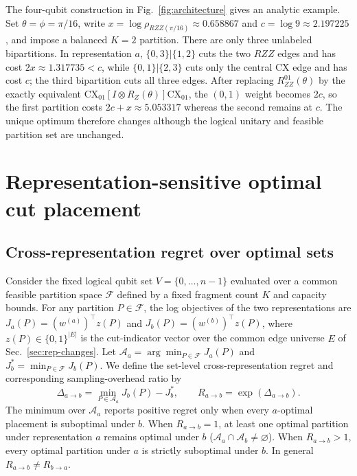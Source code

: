\documentclass[
  aps,
  pra,
  reprint,
  amsmath,
  amssymb,
  longbibliography,
  nofootinbib,
  floatfix
]{revtex4-2}
\theoremstyle{plain}
\begin{document}
The four-qubit construction in Fig.~\ref{fig:architecture} gives an analytic example. Set $\theta=\phi=\pi/16$, write $x=\log\rho_{RZZ(\pi/16)}\approx0.658867$ and $c=\log9\approx2.197225$, and impose a balanced $K=2$ partition. There are only three unlabeled bipartitions. In representation $a$, $\{0,3\}|\{1,2\}$ cuts the two $RZZ$ edges and has cost $2x\approx1.317735<c$, while $\{0,1\}|\{2,3\}$ cuts only the central CX edge and has cost $c$; the third bipartition cuts all three edges. After replacing $R_{ZZ}^{01}(\theta)$ by the exactly equivalent $\mathrm{CX}_{01}[I\otimes R_Z(\theta)]\mathrm{CX}_{01}$, the $(0,1)$ weight becomes $2c$, so the first partition costs $2c+x\approx5.053317$ whereas the second remains at $c$. The unique optimum therefore changes although the logical unitary and feasible partition set are unchanged.

\section{Representation-sensitive optimal cut placement}
\label{sec:rep}

\subsection{Cross-representation regret over optimal sets}
\label{sec:set-regret}

Consider the fixed logical qubit set $V=\{0,\ldots,n{-}1\}$ evaluated over a common feasible partition space $\mathcal{F}$ defined by a fixed fragment count $K$ and capacity bounds. For any partition $P\in\mathcal{F}$, the log objectives of the two representations are $J_a(P)=(w^{(a)})^\top z(P)$ and $J_b(P)=(w^{(b)})^\top z(P)$, where $z(P)\in\{0,1\}^{|E|}$ is the cut-indicator vector over the common edge universe $E$ of Sec.~\ref{sec:rep-changes}. Let $\mathcal{A}_a=\arg\min_{P\in\mathcal{F}}J_a(P)$ and $J_b^*=\min_{P\in\mathcal{F}}J_b(P)$. We define the set-level cross-representation regret and corresponding sampling-overhead ratio by
\begin{equation}
  \Delta_{a\to b} = \min_{P \in \mathcal{A}_a} J_b(P) - J_b^*, \qquad R_{a\to b} = \exp(\Delta_{a\to b}).
  \label{eq:regret}
\end{equation}
The minimum over $\mathcal{A}_a$ reports positive regret only when every $a$-optimal placement is suboptimal under $b$. When $R_{a\to b}=1$, at least one optimal partition under representation $a$ remains optimal under $b$ ($\mathcal{A}_a\cap\mathcal{A}_b\neq\varnothing$). When $R_{a\to b}>1$, every optimal partition under $a$ is strictly suboptimal under $b$. In general $R_{a\to b}\neq R_{b\to a}$.
\end{document}
